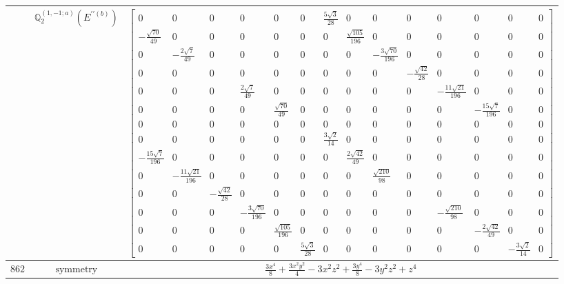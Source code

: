 \documentclass[fleqn,8pt,landscape]{jsarticle}
\begin{document}
\begin{longtable}{ccc}
$  $ & $ \mathbb{Q}_{2}^{(1,-1;a)}(E^{\prime\prime(b)}) $ & $ \begin{bmatrix} 0 & 0 & 0 & 0 & 0 & 0 & \frac{5 \sqrt{3}}{28} & 0 & 0 & 0 & 0 & 0 & 0 & 0 \\ - \frac{\sqrt{70}}{49} & 0 & 0 & 0 & 0 & 0 & 0 & \frac{\sqrt{105}}{196} & 0 & 0 & 0 & 0 & 0 & 0 \\ 0 & - \frac{2 \sqrt{7}}{49} & 0 & 0 & 0 & 0 & 0 & 0 & - \frac{3 \sqrt{70}}{196} & 0 & 0 & 0 & 0 & 0 \\ 0 & 0 & 0 & 0 & 0 & 0 & 0 & 0 & 0 & - \frac{\sqrt{42}}{28} & 0 & 0 & 0 & 0 \\ 0 & 0 & 0 & \frac{2 \sqrt{7}}{49} & 0 & 0 & 0 & 0 & 0 & 0 & - \frac{11 \sqrt{21}}{196} & 0 & 0 & 0 \\ 0 & 0 & 0 & 0 & \frac{\sqrt{70}}{49} & 0 & 0 & 0 & 0 & 0 & 0 & - \frac{15 \sqrt{7}}{196} & 0 & 0 \\ 0 & 0 & 0 & 0 & 0 & 0 & 0 & 0 & 0 & 0 & 0 & 0 & 0 & 0 \\ 0 & 0 & 0 & 0 & 0 & 0 & \frac{3 \sqrt{2}}{14} & 0 & 0 & 0 & 0 & 0 & 0 & 0 \\ - \frac{15 \sqrt{7}}{196} & 0 & 0 & 0 & 0 & 0 & 0 & \frac{2 \sqrt{42}}{49} & 0 & 0 & 0 & 0 & 0 & 0 \\ 0 & - \frac{11 \sqrt{21}}{196} & 0 & 0 & 0 & 0 & 0 & 0 & \frac{\sqrt{210}}{98} & 0 & 0 & 0 & 0 & 0 \\ 0 & 0 & - \frac{\sqrt{42}}{28} & 0 & 0 & 0 & 0 & 0 & 0 & 0 & 0 & 0 & 0 & 0 \\ 0 & 0 & 0 & - \frac{3 \sqrt{70}}{196} & 0 & 0 & 0 & 0 & 0 & 0 & - \frac{\sqrt{210}}{98} & 0 & 0 & 0 \\ 0 & 0 & 0 & 0 & \frac{\sqrt{105}}{196} & 0 & 0 & 0 & 0 & 0 & 0 & - \frac{2 \sqrt{42}}{49} & 0 & 0 \\ 0 & 0 & 0 & 0 & 0 & \frac{5 \sqrt{3}}{28} & 0 & 0 & 0 & 0 & 0 & 0 & - \frac{3 \sqrt{2}}{14} & 0 \end{bmatrix} $ \\ \hline
$ 862 $ & $ \text{symmetry} $ & $ \frac{3 x^{4}}{8} + \frac{3 x^{2} y^{2}}{4} - 3 x^{2} z^{2} + \frac{3 y^{4}}{8} - 3 y^{2} z^{2} + z^{4} $ \\

\end{longtable}
\end{document}
